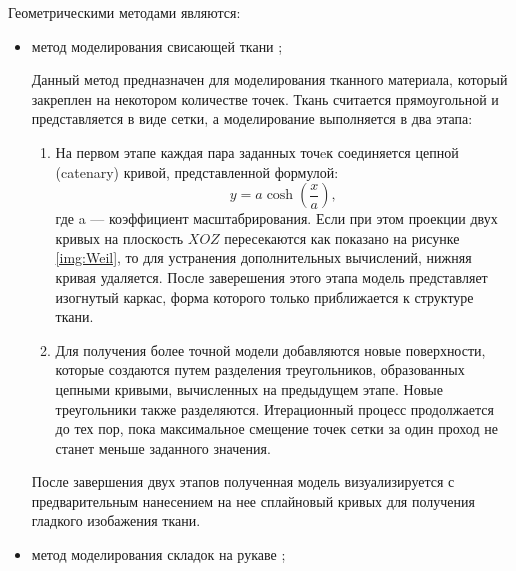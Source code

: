 Геометрическими методами являются:
\begin{itemize}[left=\parindent]
    \item метод моделирования свисающей ткани \cite{bib08};

        Данный метод предназначен для моделирования тканного материала, который
        закреплен на некотором количестве точек. Ткань считается прямоугольной
        и представляется в виде сетки, а моделирование выполняется в два этапа:
        \begin{enumerate}[label=\arabic*)]
            \item На первом этапе каждая пара заданных точeк соединяется цепной
                (catenary) кривой, представленной формулой:
                $$y = a\cosh(\frac{x}{a}),$$
                где a --- коэффициент масштабрирования. Если при этом проекции
                двух кривых на плоскость $XOZ$ пересекаются как показано на
                рисунке \ref{img:Weil}, то для устранения дополнительных
                вычислений, нижняя кривая удаляется. После заверешения этого
                этапа модель представляет изогнутый каркас, форма которого
                только приближается к структуре ткани. 
            \item Для получения более точной модели добавляются новые
                поверхности, которые создаются путем разделения треугольников,
                образованных цепными кривыми, вычисленных на предыдущем этапе.
                Новые треугольники также разделяются. Итерационный процесс
                продолжается до тех пор, пока максимальное смещение точек сетки
                за один проход не станет меньше заданного значения.
        \end{enumerate}
        После завершения двух этапов полученная модель визуализируется с
        предварительным нанесением на нее сплайновый кривых для получения
        гладкого изобажения ткани\cite{bib08}\cite{bib07}.

    \item метод моделирования складок на рукаве \cite{bib07};


\end{itemize}
